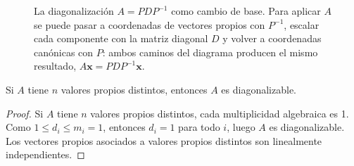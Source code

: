 \begin{figure}[!htbp]
\centering
{}
\caption{La diagonalización $A=PDP^{-1}$ como cambio de base. Para aplicar $A$ se puede pasar a coordenadas de vectores propios con $P^{-1}$, escalar cada componente con la matriz diagonal $D$ y volver a coordenadas canónicas con $P$: ambos caminos del diagrama producen el mismo resultado, $A\mathbf{x}=PDP^{-1}\mathbf{x}$.}
\label{fig:diagonalizacion_cajas}
\end{figure}
\begin{theorem} Si $A$ tiene $n$ valores propios distintos, entonces $A$ es diagonalizable.
\begin{proof}
Si $A$ tiene $n$ valores propios distintos, cada multiplicidad algebraica es 1. Como $1 \leq d_i \leq m_i = 1$, entonces $d_i = 1$ para todo $i$, luego $A$ es diagonalizable. Los vectores propios asociados a valores propios distintos son linealmente independientes.
\end{proof}
\end{theorem}



